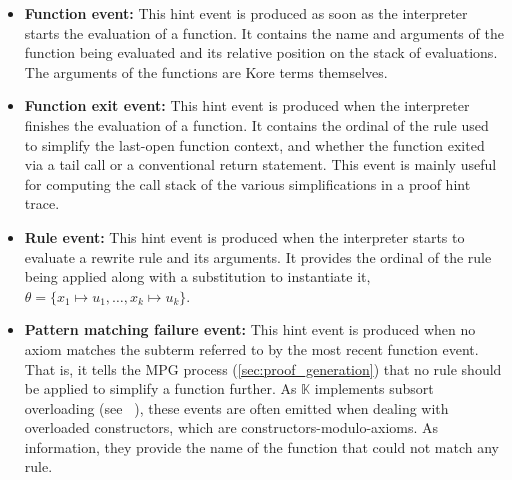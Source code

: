 \documentclass{article}
\theoremstyle{plain}
\theoremstyle{definition}
\newcommand{\K}{$\mathbb{K}$\xspace}
\begin{document}
\begin{itemize}
    \item \textbf{Function event:} This hint event is produced as soon as the interpreter starts the evaluation of a function. It contains the name and arguments of the function being evaluated and its relative position on the stack of evaluations. The arguments of the functions are Kore terms themselves.
    \item \textbf{Function exit event:} This hint event is produced when the interpreter finishes the evaluation of a function. It contains the ordinal of the rule used to simplify the last-open function context,
    and whether the function exited via a tail call or a conventional return statement. This event is mainly useful for computing the call stack of the various simplifications in a proof hint trace.
    \item \textbf{Rule event:} This hint event is produced when the interpreter starts to evaluate a rewrite rule and its arguments. It provides the ordinal of the rule being applied along with a substitution to instantiate it, $\theta = \{x_1\mapsto u_1,\ldots,x_k\mapsto u_k\}$.
    \item \textbf{Pattern matching failure event:} This hint event is produced when no axiom matches the subterm referred to by the most recent function event. That is, it tells the MPG process (\cref{sec:proof_generation}) that no rule should be applied to simplify a function further. As \K implements subsort overloading (see ~\cite{K-user-manual}), these events are often emitted when dealing with overloaded constructors, which are constructors-modulo-axioms. As information, they provide the name of the function that could not match any rule.


\end{itemize}
\end{document}
